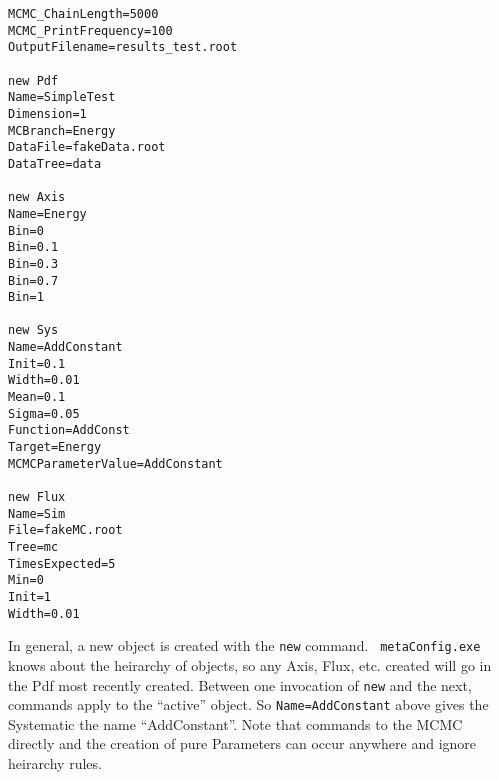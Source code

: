 \begin{verbatim}
MCMC_ChainLength=5000
MCMC_PrintFrequency=100
OutputFilename=results_test.root

new Pdf
Name=SimpleTest
Dimension=1
MCBranch=Energy
DataFile=fakeData.root
DataTree=data

new Axis
Name=Energy
Bin=0
Bin=0.1
Bin=0.3
Bin=0.7
Bin=1

new Sys
Name=AddConstant
Init=0.1
Width=0.01
Mean=0.1
Sigma=0.05
Function=AddConst
Target=Energy
MCMCParameterValue=AddConstant

new Flux
Name=Sim
File=fakeMC.root
Tree=mc
TimesExpected=5
Min=0
Init=1
Width=0.01
\end{verbatim}

In general, a new object is created with the \verb|new| command.  {\tt
metaConfig.exe} knows about the heirarchy of objects, so any Axis,
Flux, etc. created will go in the Pdf most recently created.  Between
one invocation of \verb|new| and the next, commands apply to the
``active'' object.  So \verb|Name=AddConstant| above gives the Systematic
the name ``AddConstant''.  Note that commands to the MCMC directly and
the creation of pure Parameters can occur anywhere and ignore
heirarchy rules.

